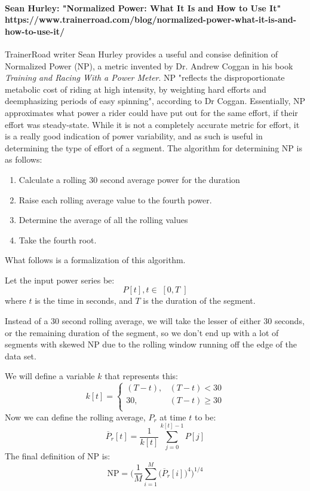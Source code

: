 \documentclass[12pt,a4paper]{report}
\begin{document}
\paragraph{Sean Hurley: "Normalized Power: What It Is and How to Use It" https://www.trainerroad.com/blog/normalized-power-what-it-is-and-how-to-use-it/}
TrainerRoad writer Sean Hurley provides a useful and consise definition of Normalized Power (NP), a metric invented by Dr. Andrew Coggan in his book \textit{Training and Racing With a Power Meter}. NP
"reflects the disproportionate metabolic cost of riding at high intensity, by weighting hard efforts and deemphasizing periods of easy spinning", according to Dr Coggan.
Essentially, NP approximates what power a rider could have put out for the same effort, if their effort was steady-state. While it is not a completely accurate metric for effort, it is a really
good indication of power variability, and as such is useful in determining the type of effort of a segment. The algorithm for determining NP is as follows:
\begin{enumerate}
	\item Calculate a rolling 30 second average power for the duration
	\item Raise each rolling average value to the fourth power.
	\item Determine the average of all the rolling values
	\item Take the fourth root.
\end{enumerate}

What follows is a formalization of this algorithm.

Let the input power series be:
\[
	P[t], t \in \;[0,T\;]
\]
where $t$ is the time in seconds, and $T$ is the duration of the segment.

Instead of a 30 second rolling average, we will take the lesser of either 30 seconds, or the remaining duration of the segment, so we don't end up
with a lot of segments with skewed NP due to the rolling window running off the edge of the data set.

We will define a variable $k$ that represents this:
\[
	k[t] = \begin{cases}
		(T-t), & (T-t) < 30   \\
		30,    & (T-t) \ge 30 \\
	\end{cases}
\]
Now we can define the rolling average, ${P}_{r}$ at time $t$ to be:
\[
	\overline{P}_{r}[t] = \frac{1}{k[t]} \sum_{j=0}^{k[t]-1} P[j]
\]
The final definition of NP is:
\[
	\mathrm{NP} = \bigg( \frac{1}{M} \sum_{i=1}^{M}\big(\overline{P}_{r}[i]\big)^{4}\bigg)^{1/4}
\]
\end{document}
